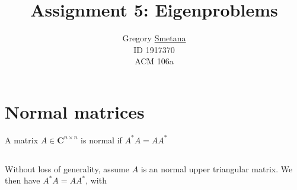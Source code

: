 \documentclass[11pt]{article} %
\title{Assignment 5: Eigenproblems}
\author{ Gregory \uline{Smetana} \\ID 1917370 \\ ACM 106a }
\begin{document}
\maketitle


\section{Normal matrices}
A matrix $A \in \mathbf{C}^{n \times n}$ is normal if $A^*A = A A^*$
\subsection{} %
Without loss of generality, assume $A$ is an normal upper  triangular matrix. We then have $A^*A = A A^*$, with
\newcommand\x{\times}
\newcommand\bigzero{\makebox(0,0){\text{\huge0}}}
\newcommand*{\bordl}{\multicolumn{1}{c|}{}}
\newcommand*{\bordr}{\multicolumn{1}{|c}{}}
\end{document}
